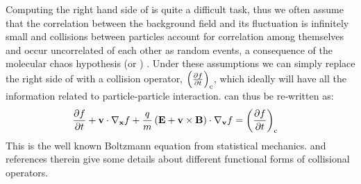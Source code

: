             Computing the right hand side of  is quite a difficult task, thus we often
            assume that the correlation between the background field and its fluctuation is
            infinitely small and collisions between particles account for correlation among
            themselves and occur uncorrelated of each other as random events, a consequence of the
            molecular chaos hypothesis (or
            ) \citep{ClerkMaxwell1867}. Under these assumptions we can simply replace
            the right side of  with a collision operator, $\left(\frac{\partial
            \mathnormal{f}}{\partial t}\right)_{\rm c}$, which ideally will have all the information
            related to particle-particle interaction.  can thus be re-written as:
            \begin{align}
                \frac{\partial \mathnormal{f}}{\partial t} + \mathbf{v} \cdot \nabla_{\mathbf{x}}\mathnormal{f} + \frac{q}{m}\left(\mathbf{E} + \mathbf{v} \times \mathbf{B}\right) \cdot \nabla_{\mathbf{v}} \mathnormal{f} & = \left(\frac{\partial \mathnormal{f}}{\partial t}\right)_{\rm c} \label{eq:bolt}
            \end{align}
            This is the well known Boltzmann equation from statistical mechanics.
            \citet{Baumjohann1996} and references therein give some details about different
            functional forms of collisional operators.
            
